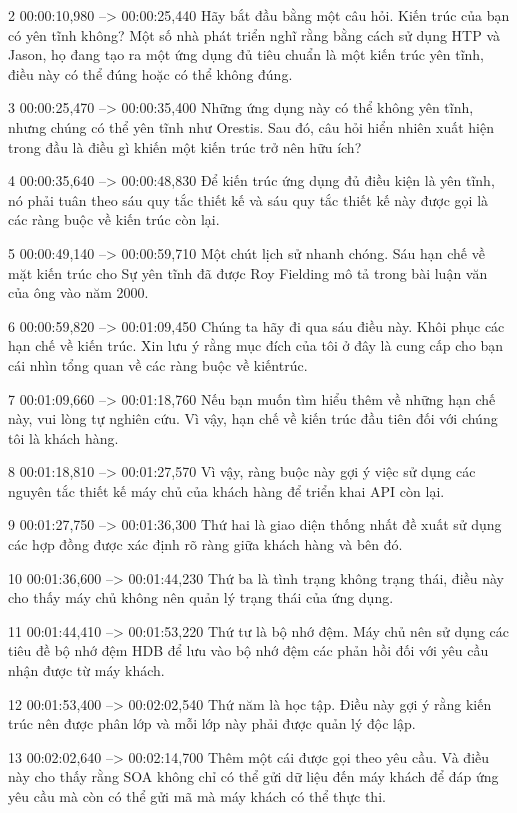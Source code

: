 2
00:00:10,980 --> 00:00:25,440
Hãy bắt đầu bằng một câu hỏi.  Kiến trúc của bạn có yên tĩnh không?  Một số nhà phát triển nghĩ rằng bằng cách sử dụng HTP và Jason, họ đang tạo ra một ứng dụng đủ tiêu chuẩn là một kiến ​​trúc yên tĩnh, điều này có thể đúng hoặc có thể không đúng.

3
00:00:25,470 --> 00:00:35,400
Những ứng dụng này có thể không yên tĩnh, nhưng chúng có thể yên tĩnh như Orestis.  Sau đó, câu hỏi hiển nhiên xuất hiện trong đầu là điều gì khiến một kiến ​​trúc trở nên hữu ích?

4
00:00:35,640 --> 00:00:48,830
Để kiến ​​trúc ứng dụng đủ điều kiện là yên tĩnh, nó phải tuân theo sáu quy tắc thiết kế và sáu quy tắc thiết kế này được gọi là các ràng buộc về kiến ​​trúc còn lại.

5
00:00:49,140 --> 00:00:59,710
Một chút lịch sử nhanh chóng.  Sáu hạn chế về mặt kiến ​​trúc cho Sự yên tĩnh đã được Roy Fielding mô tả trong bài luận văn của ông vào năm 2000.

6
00:00:59,820 --> 00:01:09,450
Chúng ta hãy đi qua sáu điều này.  Khôi phục các hạn chế về kiến ​​trúc.  Xin lưu ý rằng mục đích của tôi ở đây là cung cấp cho bạn cái nhìn tổng quan về các ràng buộc về kiến ​​trúc.

7
00:01:09,660 --> 00:01:18,760
Nếu bạn muốn tìm hiểu thêm về những hạn chế này, vui lòng tự nghiên cứu.  Vì vậy, hạn chế về kiến ​​trúc đầu tiên đối với chúng tôi là khách hàng.

8
00:01:18,810 --> 00:01:27,570
Vì vậy, ràng buộc này gợi ý việc sử dụng các nguyên tắc thiết kế máy chủ của khách hàng để triển khai API còn lại.

9
00:01:27,750 --> 00:01:36,300
Thứ hai là giao diện thống nhất đề xuất sử dụng các hợp đồng được xác định rõ ràng giữa khách hàng và bên đó.

10
00:01:36,600 --> 00:01:44,230
Thứ ba là tình trạng không trạng thái, điều này cho thấy máy chủ không nên quản lý trạng thái của ứng dụng.

11
00:01:44,410 --> 00:01:53,220
Thứ tư là bộ nhớ đệm.  Máy chủ nên sử dụng các tiêu đề bộ nhớ đệm HDB để lưu vào bộ nhớ đệm các phản hồi đối với yêu cầu nhận được từ máy khách.

12
00:01:53,400 --> 00:02:02,540
Thứ năm là học tập.  Điều này gợi ý rằng kiến ​​trúc nên được phân lớp và mỗi lớp này phải được quản lý độc lập.

13
00:02:02,640 --> 00:02:14,700
Thêm một cái được gọi theo yêu cầu.  Và điều này cho thấy rằng SOA không chỉ có thể gửi dữ liệu đến máy khách để đáp ứng yêu cầu mà còn có thể gửi mã mà máy khách có thể thực thi.

